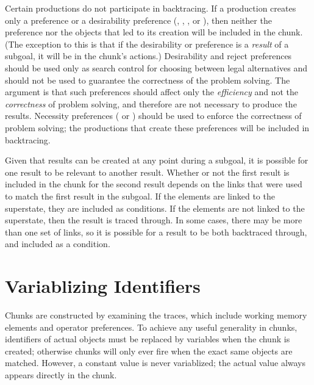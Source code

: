 Certain productions do not participate in backtracing. If a production creates
only a  preference or a desirability preference (,
, , or ), then neither the
preference nor the objects that led to its creation will be included in the
chunk. (The exception to this is that if the desirability or 
preference is a {\em result} of a subgoal, it will be in the chunk's actions.)
Desirability and reject preferences should be used only as search control for
choosing between legal alternatives and should not be used to guarantee the
correctness of the problem solving. The argument is that such preferences
should affect only the \emph{efficiency} and not the \emph{correctness} of
problem solving, and therefore are not necessary to produce the results.
Necessity preferences ( or ) should be used to
enforce the correctness of problem solving; the productions that create these
preferences will be included in backtracing.

Given that results can be created at any point during a subgoal, it is
possible for one result to be relevant to another result. Whether or not the 
first result is included in the chunk for the second result depends on the
links that were used to match the first result in the subgoal. If the elements
are linked to the superstate, they are included as conditions. If the
elements are not linked to the superstate, then the result is traced through.
In some cases, there may be more than one set of links, so it is possible for
a result to be both backtraced through, and included as a condition.


\section{Variablizing Identifiers}
\label{CHUNKING-variablizing}

Chunks are constructed by examining the traces, which include working memory
elements and operator preferences. To achieve any useful generality in chunks,
identifiers of actual objects must be replaced by variables when the chunk is
created; otherwise chunks will only ever fire when the exact same objects
are matched.  However, a constant value is never variablized; the actual 
value always appears directly in the chunk.

